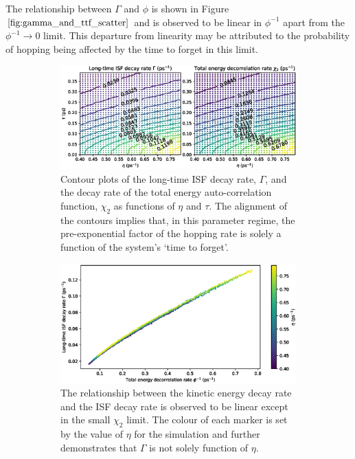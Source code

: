 \documentclass{article}
\begin{document}
The relationship between $\Gamma$ and $\phi$ is shown in Figure $\ref{fig:gamma_and_ttf_scatter}$ and is observed to be linear in $\phi^{-1}$ apart from the $\phi^{-1} \rightarrow 0$ limit. This departure from linearity may be attributed to the probability of hopping being affected by the time to forget in this limit.  

\begin{figure}
	\centering
	\begin{subfigure}{1.0\textwidth}
		\includegraphics[width=1.0\textwidth]{gamma_and_ttf_contours}
		\caption{Contour plots of the long-time ISF decay rate, $\Gamma$, and the decay rate of the total energy auto-correlation function, $\chi_2$ as functions of $\eta$ and $\tau$. The alignment of the contours implies that, in this parameter regime, the pre-exponential factor of the hopping rate is solely a function of the system's `time to forget'.}
		\label{fig:gamma_and_ttf_contours}
	\end{subfigure}
	\begin{subfigure}{1.0\textwidth}
		\includegraphics[width=1.0\textwidth]{gamma_and_ttf_scatter}
		\caption{The relationship between the kinetic energy decay rate and the ISF decay rate is observed to be linear except in the small $\chi_2$ limit. The colour of each marker is set by the value of $\eta$ for the simulation and further demonstrates that $\Gamma$ is not solely function of $\eta$.}
		\label{fig:gamma_and_ttf_scatter}
	\end{subfigure}
	\caption{}
	\label{fig:ttf_gamma}
\end{figure}
\end{document}
